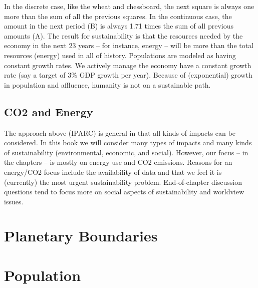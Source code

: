 \documentclass{book}\usepackage[]{graphicx}\usepackage[]{color}
\begin{document}
In the discrete case, like the wheat and chessboard, the next square is always one more than the sum of all the previous squares. In the continuous case, the amount in the next period (B) is always 1.71 times the sum of all previous amounts (A).
The result for sustainability is that the resources needed by the economy in the next 23 years – for instance, energy – will be more than the total resources (energy) used in all of history. Populations are modeled as having constant growth rates. We actively manage the economy have a constant growth rate (say a target of 3\% GDP growth per year). Because of (exponential) growth in population and affluence, humanity is not on a sustainable path. 

\section{CO2 and Energy}
The approach above (IPARC) is general in that all kinds of impacts can be considered. In this book we will consider many types of impacts and many kinds of sustainability (environmental, economic, and social). However, our focus – in the chapters – is mostly on energy use and CO2 emissions. Reasons for an energy/CO2 focus include the availability of data and that we feel it is (currently) the most urgent sustainability problem. End-of-chapter discussion questions tend to focus more on social aspects of sustainability and worldview issues.


\cleardoublepage
    

\chapter{Planetary Boundaries}
\label{chap:planetary_boundaries}





\cleardoublepage
    

\chapter{Population}
\label{chap:population}
\end{document}

